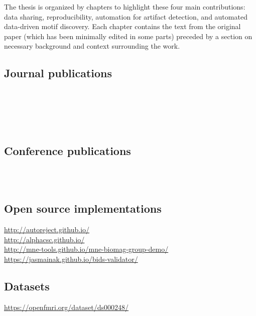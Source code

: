 The thesis is organized by chapters to highlight these four main  contributions: data sharing, reproducibility, automation for artifact detection, and automated data-driven motif discovery. Each chapter contains the text from the original paper (which has been minimally edited in some parts) preceded by a section on necessary background and context surrounding the work.

\subsection*{Journal publications}
\ \\ \\
\ \\ \\

\subsection*{Conference publications}
\ \\ \\

\subsection*{Open source implementations}

\url{http://autoreject.github.io/} \\
\url{http://alphacsc.github.io/} \\
\url{http://mne-tools.github.io/mne-biomag-group-demo/} \\
\url{https://jasmainak.github.io/bids-validator/}

\subsection*{Datasets}

\url{https://openfmri.org/dataset/ds000248/}
